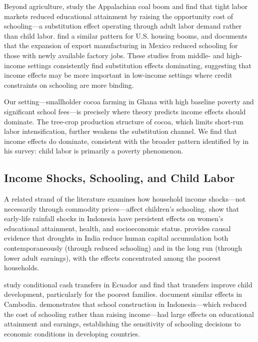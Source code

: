 \documentclass[12pt]{article}
\begin{document}
Beyond agriculture, \citet{black2005} study the Appalachian coal boom and find that tight labor markets reduced educational attainment by raising the opportunity cost of schooling---a substitution effect operating through adult labor demand rather than child labor. \citet{charles2018} find a similar pattern for U.S. housing booms, and \citet{atkin2016} documents that the expansion of export manufacturing in Mexico reduced schooling for those with newly available factory jobs. These studies from middle- and high-income settings consistently find substitution effects dominating, suggesting that income effects may be more important in low-income settings where credit constraints on schooling are more binding.

Our setting---smallholder cocoa farming in Ghana with high baseline poverty and significant school fees---is precisely where theory predicts income effects should dominate. The tree-crop production structure of cocoa, which limits short-run labor intensification, further weakens the substitution channel. We find that income effects do dominate, consistent with the broader pattern identified by \citet{edmonds2008} in his survey: child labor is primarily a poverty phenomenon.

\subsection{Income Shocks, Schooling, and Child Labor}

A related strand of the literature examines how household income shocks---not necessarily through commodity prices---affect children's schooling. \citet{maccini2009} show that early-life rainfall shocks in Indonesia have persistent effects on women's educational attainment, health, and socioeconomic status. \citet{shah2017} provides causal evidence that droughts in India reduce human capital accumulation both contemporaneously (through reduced schooling) and in the long run (through lower adult earnings), with the effects concentrated among the poorest households.

\citet{paxson2007} study conditional cash transfers in Ecuador and find that transfers improve child development, particularly for the poorest families. \citet{ferreira2012} document similar effects in Cambodia. \citet{duflo2001} demonstrates that school construction in Indonesia---which reduced the cost of schooling rather than raising income---had large effects on educational attainment and earnings, establishing the sensitivity of schooling decisions to economic conditions in developing countries.
\end{document}
